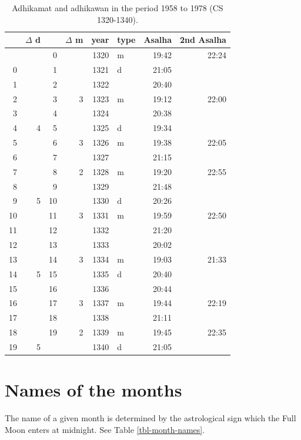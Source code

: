 \documentclass[11pt,oneside]{memoir-article}
\begin{document}
\begin{table}[p]
\caption{Adhikamat and adhikawan in the period 1958 to 1978 (CS 1320-1340).\cite{eade-interpolation}}
\centering
\begin{tabular}{rrrrrlrr}
 & $\Delta$ d &  & $\Delta$ m & year & type & Asalha & 2nd Asalha\\
\hline
 &  & 0 &  & 1320 & m & 19:42 & 22:24\\
0 &  & 1 &  & 1321 & d & 21:05 & \\
1 &  & 2 &  & 1322 &  & 20:40 & \\
2 &  & 3 & 3 & 1323 & m & 19:12 & 22:00\\
3 &  & 4 &  & 1324 &  & 20:38 & \\
4 & 4 & 5 &  & 1325 & d & 19:34 & \\
5 &  & 6 & 3 & 1326 & m & 19:38 & 22:05\\
6 &  & 7 &  & 1327 &  & 21:15 & \\
7 &  & 8 & 2 & 1328 & m & 19:20 & 22:55\\
8 &  & 9 &  & 1329 &  & 21:48 & \\
9 & 5 & 10 &  & 1330 & d & 20:26 & \\
10 &  & 11 & 3 & 1331 & m & 19:59 & 22:50\\
11 &  & 12 &  & 1332 &  & 21:20 & \\
12 &  & 13 &  & 1333 &  & 20:02 & \\
13 &  & 14 & 3 & 1334 & m & 19:03 & 21:33\\
14 & 5 & 15 &  & 1335 & d & 20:40 & \\
15 &  & 16 &  & 1336 &  & 20:44 & \\
16 &  & 17 & 3 & 1337 & m & 19:44 & 22:19\\
17 &  & 18 &  & 1338 &  & 21:11 & \\
18 &  & 19 & 2 & 1339 & m & 19:45 & 22:35\\
19 & 5 &  &  & 1340 & d & 21:05 & \\
\end{tabular}
\end{table}
\section{Names of the months}
\label{sec-4-6}

The name of a given month is determined by the astrological sign which
the Full Moon enters at midnight. See Table \ref{tbl-month-names}.
\end{document}
